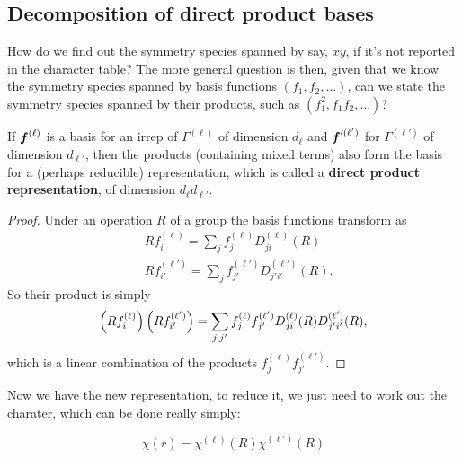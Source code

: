 \subsection{Decomposition of direct product bases}
\label{decompdirect}
How do we find out the symmetry species spanned by say, $xy$, if it's not reported in the character table?
The more general question is then, given that we know the symmetry species spanned by basis functions $(f_1,f_2,\dots)$, can we state the symmetry species spanned by their products, such as $(f_1^2,f_1f_2,\dots)$?
\begin{lemma}
If $\boldsymbol{f}^{(\ell)}$ is a basis for an irrep of $\Gamma^{(\ell)}$ of dimension $d_{\ell}$ and $\boldsymbol{f}'^{(\ell')}$ for $\Gamma^{(\ell')}$ of dimension $d_{\ell'}$, then the products (containing mixed terms) also form the basis for a (perhaps reducible) representation, which is called a \textbf{direct product representation}, of dimension $d_{\ell}d_{\ell'}$. 
\end{lemma}
\begin{proof}
Under an operation $R$ of a group the basis functions transform as 
\begin{equation}
\begin{aligned}
&Rf_i^{(\ell)}=\sum_jf_j^{(\ell)}D_{ji}^{(\ell)}(R)\\
&Rf_{i'}^{(\ell')}=\sum_jf_{j'}^{(\ell')}D_{j'i'}^{(\ell')}(R).
\end{aligned}
\end{equation}
So their product is simply
\begin{equation}
\left(Rf_i^{(\ell)} \right)\left(Rf_{i'}^{(\ell')} \right)=\sum_{j,j'}f_j^{(\ell)}f_{j'}^{(\ell')}D_{ji}^{(\ell)}(R)D_{j'i'}^{(\ell')}(R),
\end{equation}
which is a linear combination of the products $f_j^{(\ell)}f_{j'}^{(\ell')}$.
\end{proof}
Now we have the new representation, to reduce it, we just need to work out the charater, which can be done really simply:
\begin{thrm}
\begin{equation}
\chi(r)=\chi^{(\ell)}(R)\chi^{(\ell')}(R)
\end{equation}
\end{thrm}
